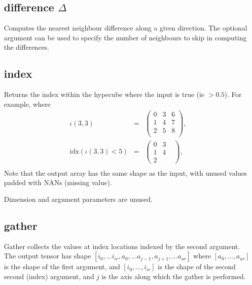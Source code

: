 \subsection{difference $\Delta$}\label{Operation:difference}
Computes the nearest neighbour difference along a given direction. The
optional argument can be used to specify the number of neighbours to
skip in computing the differences.

\subsection{index}\label{Operation:index}

Returns the index within the hypecube where the input is true (ie
$>0.5$). For example, where
\begin{eqnarray*}
  \iota(3,3) &=& \left(\begin{array}{ccc}
                         0 & 3 & 6 \\
                         1 & 4 & 7 \\
                         2 & 5 & 8 \\
                       \end{array}\right),\\
  \mathrm{idx}(\iota(3,3)<5) &=&
                                 \left(\begin{array}{ccc}
                                         0 & 3 &\\
                                         1 & 4 &\\
                                         2 & &
                                       \end{array}\right),\\
\end{eqnarray*}
Note that the output array has the same shape as the input, with
unused values padded with NANs (missing value).

Dimension and argument parameters are unused.


\subsection{gather}\label{Operation:gather}

Gather collects the values at index locations indexed by the second
argument. The output tensor has shape
$[i_0, \ldots i_{ir}, a_0,\ldots a_{j-1},a_{j+1},\ldots a_{ar}]$ where
$[a_0,\ldots,a_{ar}]$ is the shape of the first argument, and
$[i_0,\ldots,i_{ir}]$ is the shape of the second second (index)
argument, and $j$ is the axis along which the gather is performed.

